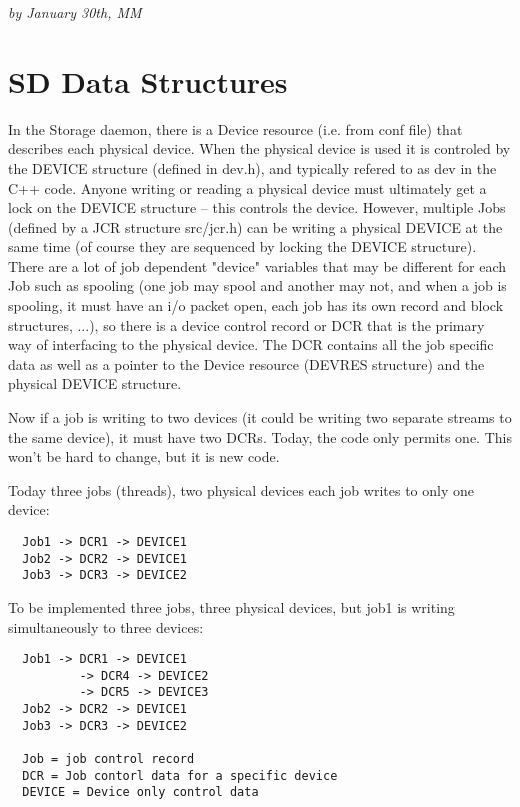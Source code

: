 {\it by
January 30th, MM }

\section{SD Data Structures}

In the Storage daemon, there is a Device resource (i.e.  from conf file)
that describes each physical device.  When the physical device is used it
is controled by the DEVICE structure (defined in dev.h), and typically
refered to as dev in the C++ code.  Anyone writing or reading a physical
device must ultimately get a lock on the DEVICE structure -- this controls
the device.  However, multiple Jobs (defined by a JCR structure src/jcr.h)
can be writing a physical DEVICE at the same time (of course they are
sequenced by locking the DEVICE structure).  There are a lot of job
dependent "device" variables that may be different for each Job such as
spooling (one job may spool and another may not, and when a job is
spooling, it must have an i/o packet open, each job has its own record and
block structures, ...), so there is a device control record or DCR that is
the primary way of interfacing to the physical device.  The DCR contains
all the job specific data as well as a pointer to the Device resource
(DEVRES structure) and the physical DEVICE structure.

Now if a job is writing to two devices (it could be writing two separate
streams to the same device), it must have two DCRs.  Today, the code only
permits one.  This won't be hard to change, but it is new code.

Today three jobs (threads), two physical devices each job
   writes to only one device:

\begin{verbatim}
  Job1 -> DCR1 -> DEVICE1
  Job2 -> DCR2 -> DEVICE1
  Job3 -> DCR3 -> DEVICE2
\end{verbatim}

To be implemented three jobs, three physical devices, but
    job1 is writing simultaneously to three devices:

\begin{verbatim}
  Job1 -> DCR1 -> DEVICE1
          -> DCR4 -> DEVICE2
          -> DCR5 -> DEVICE3
  Job2 -> DCR2 -> DEVICE1
  Job3 -> DCR3 -> DEVICE2

  Job = job control record
  DCR = Job contorl data for a specific device
  DEVICE = Device only control data
\end{verbatim}
